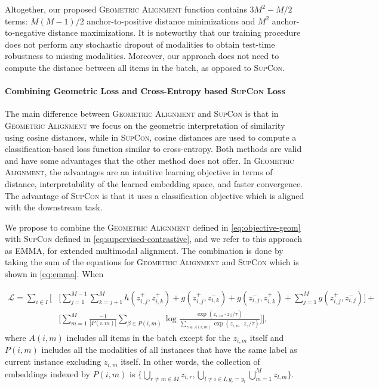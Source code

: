 \documentclass[10pt]{article} %
\newcommand{\ours}{\textsc{EMMA}}
\newcommand{\geom}{\textsc{Geometric Alignment}}
\newcommand{\supcon}{\textsc{SupCon}}
\begin{document}
Altogether, our proposed \geom{} function contains 
$3M^2-M/2$ terms: 
$M(M-1)/2$ anchor-to-positive distance minimizations and $M^2$ anchor-to-negative distance maximizations.
It is noteworthy that our training procedure does not perform any stochastic dropout of modalities to obtain test-time robustness to missing modalities. Moreover, our approach does not need to compute the distance between all items in the batch, as opposed to \supcon{}.

\paragraph{Combining Geometric Loss and Cross-Entropy based \supcon{} Loss}
\label{subsec:emma}

The main difference between \geom{} and \supcon{} is that in \geom{} we focus on the geometric interpretation of similarity using cosine distances, while in \supcon{}, cosine distances are used to compute a classification-based loss function similar to cross-entropy.
Both methods are valid and have some advantages that the other method does not offer. In \geom{}, the advantages are an intuitive learning objective in terms of distance, interpretability of the learned embedding space, and faster convergence. 
The advantage of \supcon{} is that it uses a classification objective which is aligned with the downstream task.

We propose to combine the \geom{} defined in \cref{eq:objective-geom} with \supcon{} defined in \cref{eq:supervised-contrastive}, and we refer to this approach as \ours{}, for extended multimodal alignment. The combination is done by taking the sum of the equations for \geom{} and \supcon{} which is shown in \cref{eq:emma}.
When


\begin{equation}\label{eq:emma}
\begin{split}
    \mathcal{L} =  \sum_{i \in I} \Biggr[ & \Bigr[ \sum_{j=1}^{M-1} \sum_{k=j+1}^{M} h( z_{i,j}^{+} , z_{i,k}^{+})
     + g( z_{i,j}^{+} , z_{i,k}^{-}) + g( z_{i,j}^{-} , z_{i,k}^{+}) + \sum_{j=1}^{M} g( z_{i,j}^{+} , z_{i,j}^{-} )\Bigr] + \\
     & \Bigr[ \sum_{m=1}^{M} \frac{-1}{|P(i,m)|}  \sum_{\beta \in P(i,m)} \log \frac{\exp (z_{i,m} \cdot z_{\beta} / \tau) }{\sum_{\gamma \in A(i,m)} \exp (z_{i,m} \cdot z_{\gamma} / \tau)} \Bigr] \Biggr], 
     \end{split}
\end{equation}
where $A(i,m)$ includes all items in the batch except for the $z_{i,m}$ itself and $P(i,m)$ includes all the modalities of all instances that have the same label as current instance excluding $z_{i,m}$ itself. 
In other words, the collection of embeddings indexed by $P(i,m)$ is $\{ \bigcup\limits_{r \neq m \in M} z_{i,r}, \bigcup\limits_{l \neq i \in I , y_i = y_l} \bigcup\limits_{m=1}^{M} z_{l,m} \} $.
\end{document}
